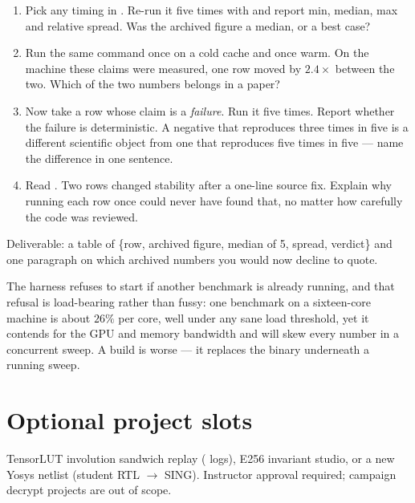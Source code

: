 \begin{enumerate}[itemsep=2pt]
  \item Pick any timing in . Re-run it five
        times with  and report min, median,
        max and relative spread. Was the archived figure a median, or a best
        case?
  \item Run the same command once on a cold cache and once warm. On the machine
        these claims were measured, one row moved by $2.4\times$ between the two.
        Which of the two numbers belongs in a paper?
  \item Now take a row whose claim is a \emph{failure}. Run it five times.
        Report whether the failure is deterministic. A negative that reproduces
        three times in five is a different scientific object from one that
        reproduces five times in five --- name the difference in one sentence.
  \item Read . Two rows changed
        stability after a one-line source fix. Explain why running each row once
        could never have found that, no matter how carefully the code was
        reviewed.
\end{enumerate}

Deliverable: a table of \{row, archived figure, median of 5, spread, verdict\}
and one paragraph on which archived numbers you would now decline to quote.

\begin{warning}
The harness refuses to start if another benchmark is already running, and that
refusal is load-bearing rather than fussy: one benchmark on a sixteen-core
machine is about $26\%$ per core, well under any sane load threshold, yet it
contends for the GPU and memory bandwidth and will skew every number in a
concurrent sweep. A build is worse --- it replaces the binary underneath a
running sweep.
\end{warning}


\section{Optional project slots}

TensorLUT involution sandwich replay ( logs), E256 invariant
studio, or a new Yosys netlist (student RTL $\to$ SING).
Instructor approval required; campaign decrypt projects are out of scope.

